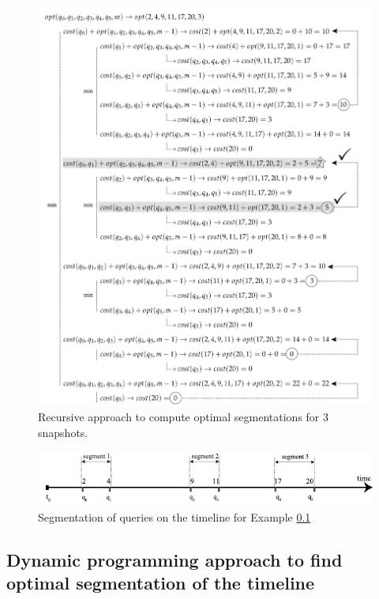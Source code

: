 			\begin{figure}
				\centering
				\includegraphics[width=\textwidth]{figs/recursion_example.pdf}
				\caption{Recursive approach to compute optimal segmentations for 3 snapshots.}
				\label{fig:example_recursive_steps}
			\end{figure}


			\begin{figure}
				\centering
				\includegraphics[width=\textwidth]{figs/example_recursive_s.pdf}
				\caption{Segmentation of queries on the timeline for Example \ref{}}
				\label{fig:example_recursive_segmentation}
			\end{figure}


		\subsection{Dynamic programming approach to find optimal segmentation of the timeline}

